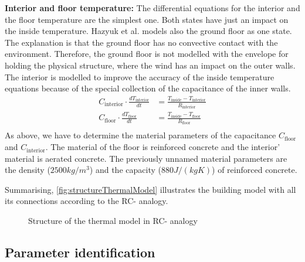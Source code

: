     \textbf{Interior and floor temperature:}\newline
    The differential equations for the interior and the floor temperature are the simplest one. Both states have just an impact on the inside temperature. 
    Hazyuk et al. \cite{Hazyuk.2012} models also the ground floor as one state. The explanation is that the ground floor has no convective contact with the environment. Therefore, the ground floor is not modelled with the envelope for holding the physical structure, where the wind has an impact on the outer walls.
    The interior is modelled to improve the accuracy of the inside temperature equations because of the special collection of the capacitance of the inner walls.
    \begin{align}
    C_\text{interior}\cdot \frac{d T_\text{interior}}{d t} &= \frac{T_\text{inside}-T_\text{interior}}{R_\text{interior}} \\
       C_\text{floor} \cdot \frac{d T_\text{floor}}{d t} &= \frac{T_\text{inside}-T_\text{floor}}{R_\text{floor}} \nonumber\\
    \end{align}
    As above, we have to determine the material parameters of the capacitance $C_\text{floor}$ and $C_\text{interior}$. The material of the floor is reinforced concrete and the interior' material is aerated concrete. The previously unnamed material parameters are the density ($2500 kg/m^3$) \cite{AntonSchweizer.12.10.2021} and the capacity ($880 J/(kg K)$) \cite{AntonSchweizer.12.10.2021b} of reinforced concrete.\newline
     
    Summarising, \autoref{fig:structureThermalModel} illustrates the building model with all its connections according to the RC- analogy.
    \begin{figure}[h]
            \centering
            \def\svgwidth{410pt}
            
            \caption{Structure of the thermal model in RC- analogy}
            \label{fig:structureThermalModel}
        \end{figure}
        
    \subsection{Parameter identification}
    \label{WorkflowModel}
    
